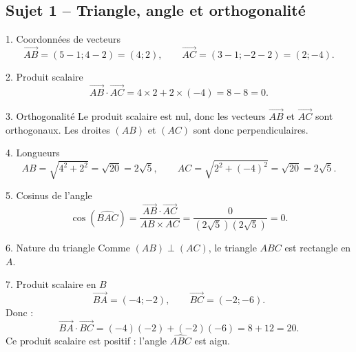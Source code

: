 \documentclass[11pt,a4paper]{article}
\begin{document}
\subsection*{Sujet 1 -- Triangle, angle et orthogonalité}
\begin{correctionbox}{1. Coordonnées de vecteurs}
\[
\overrightarrow{AB}=(5-1;4-2)=(4;2),\qquad
\overrightarrow{AC}=(3-1;-2-2)=(2;-4).
\]
\end{correctionbox}
\begin{correctionbox}{2. Produit scalaire}
\[
\overrightarrow{AB}\cdot\overrightarrow{AC}=4\times2+2\times(-4)=8-8=0.
\]
\end{correctionbox}
\begin{correctionbox}{3. Orthogonalité}
Le produit scalaire est nul, donc les vecteurs $\overrightarrow{AB}$ et $\overrightarrow{AC}$ sont orthogonaux. Les droites $(AB)$ et $(AC)$ sont donc perpendiculaires.
\end{correctionbox}
\begin{correctionbox}{4. Longueurs}
\[
AB=\sqrt{4^2+2^2}=\sqrt{20}=2\sqrt5,
\qquad
AC=\sqrt{2^2+(-4)^2}=\sqrt{20}=2\sqrt5.
\]
\end{correctionbox}
\begin{correctionbox}{5. Cosinus de l’angle}
\[
\cos(\widehat{BAC})=\frac{\overrightarrow{AB}\cdot\overrightarrow{AC}}{AB\times AC}=\frac{0}{(2\sqrt5)(2\sqrt5)}=0.
\]
\end{correctionbox}
\begin{correctionbox}{6. Nature du triangle}
Comme $(AB)\perp(AC)$, le triangle $ABC$ est rectangle en $A$.
\end{correctionbox}
\begin{correctionbox}{7. Produit scalaire en $B$}
\[
\overrightarrow{BA}=(-4;-2),\qquad \overrightarrow{BC}=(-2;-6).
\]
Donc :
\[
\overrightarrow{BA}\cdot\overrightarrow{BC}=(-4)(-2)+(-2)(-6)=8+12=20.
\]
Ce produit scalaire est positif : l’angle $\widehat{ABC}$ est aigu.
\end{correctionbox}
\end{document}
